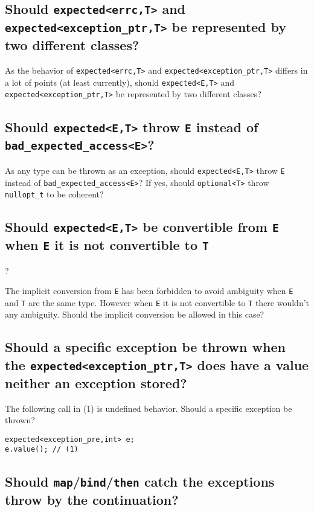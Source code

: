 \documentclass[a4paper,10pt]{article}
\newcommand{\cpp}[1]{\lstinline{#1}}
\begin{document}
\subsection{Should \cpp{expected<errc,T>} and \cpp{expected<exception_ptr,T>} be represented by two different classes?}

As the behavior of \cpp{expected<errc,T>} and \cpp{expected<exception_ptr,T>} differs in a lot of points (at least currently), should \cpp{expected<E,T>} and \cpp{expected<exception_ptr,T>} be represented by two different classes?

\subsection{Should \cpp{expected<E,T>} throw \cpp{E} instead of \cpp{bad_expected_access<E>}?}

As any type can be thrown as an exception, should \cpp{expected<E,T>} throw \cpp{E} instead of \cpp{bad_expected_access<E>}? 
If yes, should \cpp{optional<T>} throw \cpp{nullopt_t} to be coherent? 


\subsection{Should \cpp{expected<E,T>} be convertible from \cpp{E} when \cpp{E} it is not convertible to \cpp{T}}?

The implicit conversion from \cpp{E} has been forbidden to avoid ambiguity when \cpp{E} and \cpp{T} are the same type. 
However when \cpp{E} it is not convertible to \cpp{T} there wouldn't any ambiguity. 
Should the implicit conversion be allowed in this case?

\subsection{Should a specific exception be thrown when the \cpp{expected<exception_ptr,T>} does have a value neither an exception stored?}

The following call in (1) is undefined behavior. Should a specific exception be thrown?

\begin{lstlisting}
expected<exception_pre,int> e;
e.value(); // (1)
\end{lstlisting}

\subsection{Should \cpp{map}/\cpp{bind}/\cpp{then} catch the exceptions throw by the continuation?}
\end{document}
